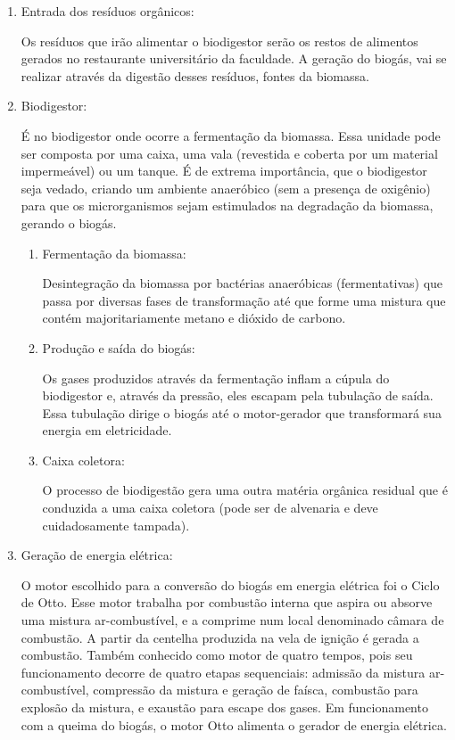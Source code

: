 \begin{enumerate}
        \item Entrada dos resíduos orgânicos:
        \par Os resíduos que irão alimentar o biodigestor serão os restos de alimentos gerados no restaurante universitário da faculdade. A geração do biogás, vai se realizar através da digestão desses resíduos, fontes da biomassa.
        \item Biodigestor:
        \par É no biodigestor onde ocorre a fermentação da biomassa. Essa unidade pode ser composta por uma caixa, uma vala (revestida e coberta por um material impermeável) ou um tanque. É de extrema importância, que o biodigestor seja vedado, criando um ambiente anaeróbico (sem a presença de oxigênio) para que os microrganismos sejam estimulados na degradação da biomassa, gerando o biogás.
        \begin{enumerate}
                \item Fermentação da biomassa:
                \par Desintegração da biomassa por bactérias anaeróbicas (fermentativas) que passa por diversas fases de transformação até que forme uma mistura que contém majoritariamente metano e dióxido de carbono.
                \item Produção e saída do biogás:
                \par Os gases produzidos através da fermentação inflam a cúpula do biodigestor e, através da pressão, eles escapam pela tubulação de saída. Essa tubulação dirige o biogás até o motor-gerador que transformará sua energia em eletricidade.
                \item Caixa coletora:
                \par O processo de biodigestão gera uma outra matéria orgânica residual que é conduzida a uma caixa coletora (pode ser de alvenaria e deve cuidadosamente tampada).
        \end{enumerate}
        \item Geração de energia elétrica:
        \par O motor escolhido para a conversão do biogás em energia elétrica foi o Ciclo de Otto. Esse motor trabalha por combustão interna que aspira ou absorve uma mistura ar-combustível, e a comprime num local denominado câmara de combustão. A partir da centelha produzida na vela de ignição é gerada a combustão. Também conhecido como motor de quatro tempos, pois seu funcionamento decorre de quatro etapas sequenciais: admissão da mistura ar-combustível, compressão da mistura e geração de faísca, combustão para explosão da mistura, e exaustão para escape dos gases. Em funcionamento com a queima do biogás, o motor Otto alimenta o gerador de energia elétrica.
\end{enumerate}

